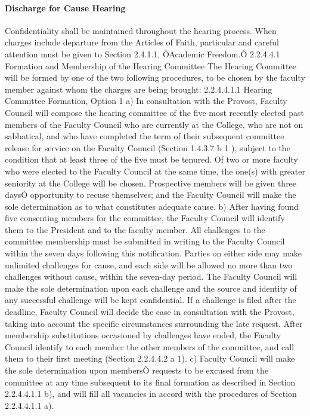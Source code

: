 \documentclass[letterpaper, 11pt]{article}
\begin{document}
			\paragraph{Discharge for Cause Hearing}
				Confidentiality shall be maintained throughout the hearing process.  When charges include departure from the Articles of Faith, particular and careful attention must be given to Section 2.4.1.1, ÒAcademic Freedom.Ó
				2.2.4.4.1 Formation and Membership of the Hearing Committee
				The Hearing Committee will be formed by one of the two following procedures, to be chosen by the faculty member against whom the charges are being brought:
				2.2.4.4.1.1 Hearing Committee Formation, Option 1
				a) In consultation with the Provost, Faculty Council will compose the hearing committee of the five most recently elected past members of the Faculty Council who are currently at the College, who are not on sabbatical, and who have completed the term of their subsequent committee release for service on the Faculty Council (Section 1.4.3.7 b 1 ), subject to the condition that at least three of the five must be tenured.  Of two or more faculty who were elected to the Faculty Council at the same time, the one(s) with greater seniority at the College will be chosen.  Prospective members will be given three daysÕ opportunity to recuse themselves; and the Faculty Council will make the sole determination as to what constitutes adequate cause.
				b) After having found five consenting members for the committee, the Faculty Council will identify them to the President and to the faculty member.  All challenges to the committee membership must be submitted in writing to the Faculty Council within the seven days following this notification.  Parties on either side may make unlimited challenges for cause, and each side will be allowed no more than two challenges without cause, within the seven-day period.  The Faculty Council will make the sole determination upon each challenge and the source and identity of any successful challenge will be kept confidential.  If a challenge is filed after the deadline, Faculty Council will decide the case in consultation with the Provost, taking into account the specific circumstances surrounding the late request.  After membership substitutions occasioned by challenges have ended, the Faculty Council identify to each member the other members of the committee, and call them to their first meeting (Section 2.2.4.4.2 a 1).
				c) Faculty Council will make the sole determination upon membersÕ requests to be excused from the committee at any time subsequent to its final formation as described in Section 2.2.4.4.1.1 b), and will fill all vacancies in accord with the procedures of Section 2.2.4.4.1.1 a).
\end{document}
